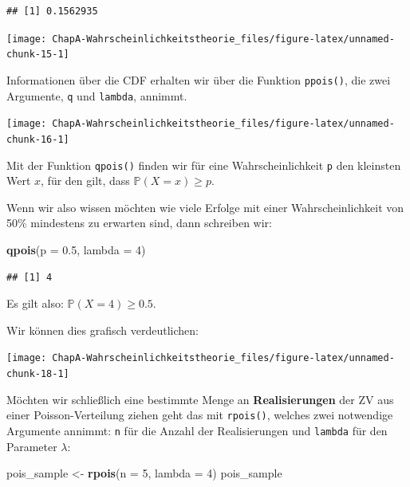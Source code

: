 \documentclass[]{book}
\newenvironment{Shaded}{\begin{snugshade}}{\end{snugshade}}
\newcommand{\KeywordTok}[1]{\textcolor[rgb]{0.13,0.29,0.53}{\textbf{#1}}}
\newcommand{\DataTypeTok}[1]{\textcolor[rgb]{0.13,0.29,0.53}{#1}}
\newcommand{\DecValTok}[1]{\textcolor[rgb]{0.00,0.00,0.81}{#1}}
\newcommand{\FloatTok}[1]{\textcolor[rgb]{0.00,0.00,0.81}{#1}}
\newcommand{\StringTok}[1]{\textcolor[rgb]{0.31,0.60,0.02}{#1}}
\newcommand{\NormalTok}[1]{#1}
\begin{document}
\begin{verbatim}
## [1] 0.1562935
\end{verbatim}

\begin{center}\texttt{[image: ChapA-Wahrscheinlichkeitstheorie\_files/figure-latex/unnamed-chunk-15-1]} \end{center}

Informationen über die CDF erhalten wir über die Funktion
\texttt{ppois()}, die zwei Argumente, \texttt{q} und \texttt{lambda},
annimmt.

\begin{center}\texttt{[image: ChapA-Wahrscheinlichkeitstheorie\_files/figure-latex/unnamed-chunk-16-1]} \end{center}

Mit der Funktion \texttt{qpois()} finden wir für eine Wahrscheinlichkeit
\texttt{p} den kleinsten Wert \(x\), für den gilt, dass
\(\mathbb{P}(X=x)\geq p\).

Wenn wir also wissen möchten wie viele Erfolge mit einer
Wahrscheinlichkeit von 50\% mindestens zu erwarten sind, dann schreiben
wir:

\begin{Shaded}
\begin{Highlighting}[]
\KeywordTok{qpois}\NormalTok{(}\DataTypeTok{p =} \FloatTok{0.5}\NormalTok{, }\DataTypeTok{lambda =} \DecValTok{4}\NormalTok{)}
\end{Highlighting}
\end{Shaded}

\begin{verbatim}
## [1] 4
\end{verbatim}

Es gilt also: \(\mathbb{P}(X=4)\geq 0.5\).

Wir können dies grafisch verdeutlichen:

\begin{center}\texttt{[image: ChapA-Wahrscheinlichkeitstheorie\_files/figure-latex/unnamed-chunk-18-1]} \end{center}

Möchten wir schließlich eine bestimmte Menge an \textbf{Realisierungen}
der ZV aus einer Poisson-Verteilung ziehen geht das mit
\texttt{rpois()}, welches zwei notwendige Argumente annimmt: \texttt{n}
für die Anzahl der Realisierungen und \texttt{lambda} für den Parameter
\(\lambda\):

\begin{Shaded}
\begin{Highlighting}[]
\NormalTok{pois_sample <-}\StringTok{ }\KeywordTok{rpois}\NormalTok{(}\DataTypeTok{n =} \DecValTok{5}\NormalTok{, }\DataTypeTok{lambda =} \DecValTok{4}\NormalTok{)}
\NormalTok{pois_sample}
\end{Highlighting}
\end{Shaded}
\end{document}
